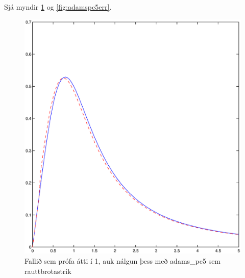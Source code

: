 \documentclass[a4]{article}
\begin{document}
\subsection{}


Sjá myndir \ref{fig:adamspc5plot} og \ref{fig:adamspc5err}.
\begin{figure}[]
  \begin{center}
    \includegraphics[scale=0.5]{adamspc5plot.eps}
  \end{center}
  \caption{Fallið sem prófa átti í 1, auk nálgun þess með adams\_pc5 sem rauttbrotastrik}
  \label{fig:adamspc5plot}
\end{figure}
\end{document}
